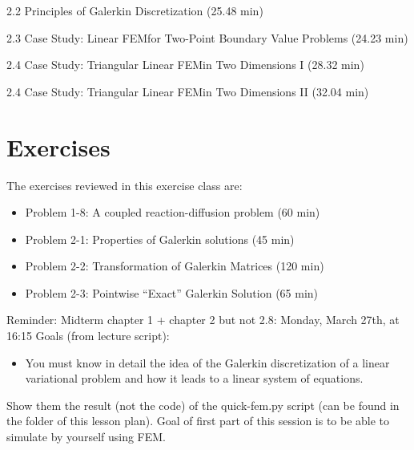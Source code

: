 




\begin{Theory}
\item 2.2 Principles of Galerkin Discretization (25.48 min)
\item 2.3 Case Study: Linear FEMfor Two-Point Boundary Value Problems (24.23 min)
\item 2.4 Case Study: Triangular Linear FEMin Two Dimensions I (28.32 min)
\item 2.4 Case Study: Triangular Linear FEMin Two Dimensions II (32.04 min)
\end{Theory}

\section*{Exercises}
The exercises reviewed in this exercise class are:
\begin{itemize}
    \item Problem 1-8: A coupled reaction-diffusion problem (60 min)
    \item Problem 2-1: Properties of Galerkin solutions (45 min)
    \item Problem 2-2: Transformation of Galerkin Matrices (120 min)
    \item Problem 2-3: Pointwise “Exact” Galerkin Solution (65 min)
\end{itemize}



\tableofcontents

\newpage



Reminder: Midterm chapter 1 + chapter 2 but not 2.8: Monday, March 27th, at 16:15
Goals (from lecture script):
\begin{itemize}
    \item You must know in detail the idea of the Galerkin discretization of a linear variational problem and how it leads to a linear system of equations.
\end{itemize}

 Show them the result (not the code) of the quick-fem.py script (can be found in the folder of this lesson plan). Goal of first part of this session is to be able to simulate by yourself using FEM.


